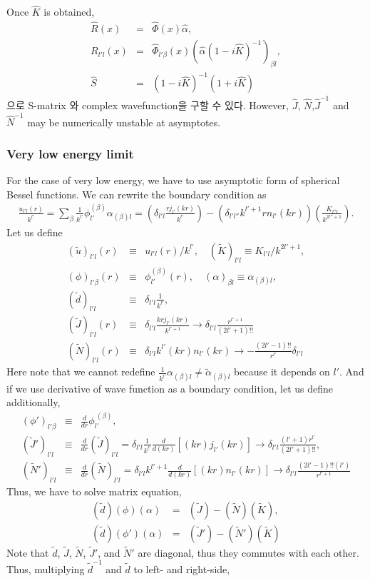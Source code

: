 \documentclass[10pt]{book}
\newcommand{\bea}{\begin{eqnarray}}
\newcommand{\eea}{\end{eqnarray}}
\newcommand{\no}{\nonumber \\}
\begin{document}
Once $\hat{K}$ is obtained,
\bea
\hat{R}(x)&=&\hat{\Phi}(x)\hat{\alpha},\no
R_{l'l}(x)&=&\hat{\Phi}_{l'\beta}(x)(\hat{\alpha}(1-i\hat{K})^{-1})_{\beta l},\no
\hat{S}&=&(1-i\hat{K})^{-1}(1+i\hat{K})
\eea
으로 S-matrix 와 complex wavefunction을 구할 수 있다.
However, $\hat{J}$, $\hat{N}$,$\hat{J}^{-1}$ and $\hat{N}^{-1}$
may be numerically unstable at asymptotes. 

\subsubsection{ Very low energy limit } 
For the case of very low energy, we have to use asymptotic form
of spherical Bessel functions. We can rewrite the boundary condition
as
\bea
\frac{u_{l'l}(r)}{k^{l'}}
=\sum_{\beta} \frac{1}{k^{l'}}\phi_{l'}^{(\beta)}\alpha_{(\beta)l}
=\left(\delta_{l'l} \frac{r j_{l'}(kr)}{k^{l'}}\right)
-\left(\delta_{l' l''} k^{l'+1}r n_{l'}(kr)\right)
 \left(\frac{K_{l'' l}}{k^{2l''+1}}\right).
\eea
Let us define
\bea
(\tilde{u})_{l'l}(r)&\equiv& u_{l'l}(r)/k^{l'},
\quad (\tilde{K})_{l'l}\equiv K_{l'l}/k^{2l'+1},\no
(\phi)_{l'\beta}(r)&\equiv& \phi_{l'}^{(\beta)}(r),
\quad ({\alpha})_{\beta l}\equiv {\alpha}_{(\beta)l},\no
(\tilde{d})_{l'l}&\equiv&\delta_{l'l}\frac{1}{k^{l'}},\no
(\tilde{J})_{l'l}(r)&\equiv& \delta_{l'l}\frac{k r j_{l'}(kr)}{k^{l'+1}}
       \to \delta_{l'l}\frac{r^{l'+1}}{(2l'+1)!!}
       \no
(\tilde{N})_{l'l}(r)&\equiv&  \delta_{l'l} k^{l'} (kr)n_{l'}(kr)
       \to -\frac{(2l'-1)!!}{r^{l'}}\delta_{l'l} 
\eea
Here note that we cannot redefine 
$\frac{1}{k^{l'}}\alpha_{(\beta)l}\neq \tilde{\alpha}_{(\beta)l} $
because it depends on $l'$. 
And if we use derivative of wave function as a boundary condition,
let us define additionally,
\bea
({\phi}')_{l'\beta}&\equiv& \frac{d}{dr}\phi_{l'}^{\ (\beta)},\no
(\tilde{J}')_{l'l}&\equiv& \frac{d}{dr}(\tilde{J})_{l'l}
                   =\delta_{l'l}\frac{1}{k^{l'}}
                    \frac{d}{d(kr)}[(kr)j_{l'}(kr)]
                   \to \delta_{l'l}\frac{(l'+1)r^{l'}}{(2l'+1)!!}
                   ,\no
(\tilde{N}')_{l'l}&\equiv&\frac{d}{dr}(\tilde{N})_{l'l}
                  =\delta_{l'l} k^{l'+1}\frac{d}{d(kr)}[(kr)n_{l'}(kr)]
                  \to \delta_{l'l}\frac{(2l'-1)!!(l')}{r^{l'+1}}   
\eea
Thus, we have to solve matrix equation,
\bea
(\tilde{d})(\phi)({\alpha})&=&(\tilde{J})-(\tilde{N})(\tilde{K}),\no
(\tilde{d})(\phi')({\alpha})&=&(\tilde{J}')-(\tilde{N}')(\tilde{K})
\eea
Note that $\tilde{d}$, $\tilde{J}$, $\tilde{N}$, $\tilde{J}'$,
and $\tilde{N}'$ are diagonal, thus they commutes with each other.
Thus, multiplying $\tilde{d}^{-1}$ and $\tilde{d}$ to left- and right-side,
\end{document}
